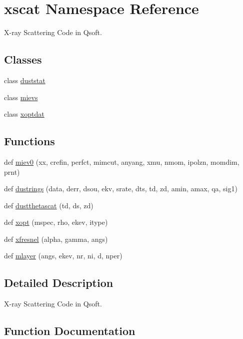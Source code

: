 \hypertarget{namespacexscat}{}\section{xscat Namespace Reference}
\label{namespacexscat}


X-\/ray Scattering Code in Qsoft.  


\subsection*{Classes}
\begin{DoxyCompactItemize}
\item 
class \hyperlink{classxscat_1_1duststat}{duststat}
\item 
class \hyperlink{classxscat_1_1mievs}{mievs}
\item 
class \hyperlink{classxscat_1_1xoptdat}{xoptdat}
\end{DoxyCompactItemize}
\subsection*{Functions}
\begin{DoxyCompactItemize}
\item 
def \hyperlink{namespacexscat_af5ec8b4518632d40c829f6671d5ba4e0}{miev0} (xx, crefin, perfct, mimcut, anyang, xmu, nmom, ipolzn, momdim, prnt)
\item 
def \hyperlink{namespacexscat_ad629df7fe94015b7bf84e23bd147ef60}{dustrings} (data, derr, dsou, ekv, srate, dts, td, zd, amin, amax, qa, sig1)
\item 
def \hyperlink{namespacexscat_a30a3faecca5dc0a525a60089fb6b85b6}{dustthetascat} (td, ds, zd)
\item 
def \hyperlink{namespacexscat_a86f03d606ff7987c55f5c3b9d8760da5}{xopt} (mspec, rho, ekev, itype)
\item 
def \hyperlink{namespacexscat_aec99c26506a5b0eb10d3d43a596e5ec6}{xfresnel} (alpha, gamma, angs)
\item 
def \hyperlink{namespacexscat_a899176101273a6394bc42bbbd49a80b0}{mlayer} (angs, ekev, nr, ni, d, nper)
\end{DoxyCompactItemize}


\subsection{Detailed Description}
X-\/ray Scattering Code in Qsoft. 

\subsection{Function Documentation}
\mbox{\label{namespacexscat_ad629df7fe94015b7bf84e23bd147ef60}} 
